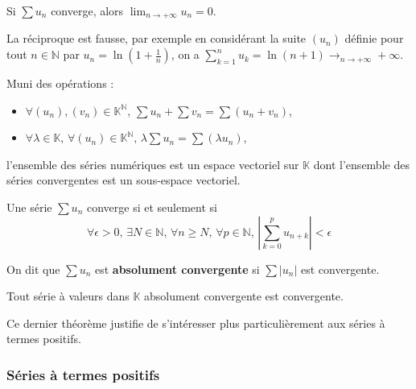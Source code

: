 
  \begin{proposition}
    Si $\sum u_n$ converge, alors $\lim_{n \rightarrow +\infty} u_n = 0$.
  \end{proposition}

  \begin{cexample}
    La réciproque est fausse, par exemple en considérant la suite $(u_n)$ définie pour tout $n \in \mathbb{N}$ par $u_n = \ln(1 + \frac{1}{n})$, on a $\sum_{k=1}^{n} u_k = \ln(n+1) \longrightarrow_{n \rightarrow +\infty} +\infty$.
  \end{cexample}

  \begin{proposition}
    Muni des opérations :
    \begin{itemize}
      \item $\forall (u_n), (v_n) \in \mathbb{K}^{\mathbb{N}}, \, \sum u_n + \sum v_n = \sum (u_n + v_n)$,
      \item $\forall \lambda \in \mathbb{K}, \, \forall (u_n) \in \mathbb{K}^{\mathbb{N}}, \, \lambda \sum u_n = \sum (\lambda u_n)$,
    \end{itemize}
    l'ensemble des séries numériques est un espace vectoriel sur $\mathbb{K}$ dont l'ensemble des séries convergentes est un sous-espace vectoriel.
  \end{proposition}


  \begin{proposition}
    Une série $\sum u_n$ converge si et seulement si
    \[ \forall \epsilon > 0, \, \exists N \in \mathbb{N}, \, \forall n \geq N, \, \forall p \in \mathbb{N}, \, \left| \sum_{k=0}^{p} u_{n+k} \right| < \epsilon \]
  \end{proposition}

  \begin{definition}
    On dit que $\sum u_n$ est \textbf{absolument convergente} si $\sum |u_n|$ est convergente.
  \end{definition}

  \begin{theorem}
    Tout série à valeurs dans $\mathbb{K}$ absolument convergente est convergente.
  \end{theorem}

  Ce dernier théorème justifie de s'intéresser plus particulièrement aux séries à termes positifs.

  \subsubsection{Séries à termes positifs}

